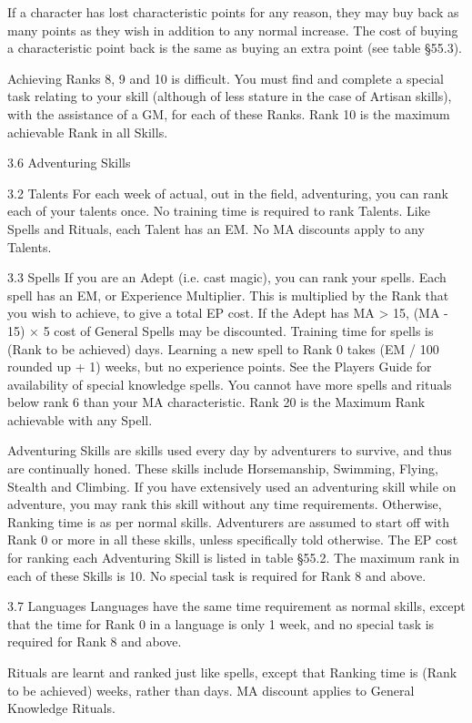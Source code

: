 \documentclass[a4paper]{article}
\begin{document}
\begin{multicols}{3}
If a character has lost characteristic points for any
reason, they may buy back as many points as they
wish in addition to any
normal increase. The cost of buying a characteristic
point back is the same as buying an extra point (see
table §55.3).

Achieving Ranks 8, 9 and 10 is difficult. You must
find and complete a special task relating to your
skill (although of less stature in the case of Artisan
skills), with the assistance of a GM, for each of
these Ranks. Rank 10 is the maximum achievable
Rank in all Skills.

3.6 Adventuring Skills

3.2 Talents
For each week of actual, out in the field, adventuring, you can rank each of your talents once. No
training time is required to rank Talents. Like
Spells and Rituals, each Talent has an EM. No MA
discounts apply to any Talents.

3.3 Spells
If you are an Adept (i.e. cast magic), you can rank
your spells. Each spell has an EM, or Experience
Multiplier. This is multiplied by the Rank that you
wish to achieve, to give a total EP cost. If the
Adept has MA > 15, (MA - 15) × 5%
cost of General Spells may be discounted. Training
time for spells is (Rank to be achieved) days.
Learning a new spell to Rank 0 takes (EM / 100
rounded up + 1) weeks, but no experience points.
See the Players Guide for availability of special
knowledge spells. You cannot have more spells
and rituals below rank 6 than your MA characteristic. Rank 20 is the Maximum Rank achievable with
any Spell.

Adventuring Skills are skills used every day by
adventurers to survive, and thus are continually
honed. These skills include Horsemanship, Swimming, Flying, Stealth and Climbing.
If you have extensively used an adventuring skill
while on adventure, you may rank this skill without
any time requirements. Otherwise, Ranking time is
as per normal skills.
Adventurers are assumed to start off with Rank 0
or more in all these skills, unless specifically told
otherwise. The EP cost for ranking each Adventuring Skill is listed in table §55.2. The maximum
rank in each of these Skills is 10. No special task is
required for Rank 8 and above.

3.7 Languages
Languages have the same time requirement as
normal skills, except that the time for Rank 0 in a
language is only 1 week, and no special task is
required for Rank 8 and above.

Rituals are learnt and ranked just like spells, except
that Ranking time is (Rank to be achieved) weeks,
rather than days. MA discount applies to General
Knowledge Rituals.


\end{multicols}
\end{document}
